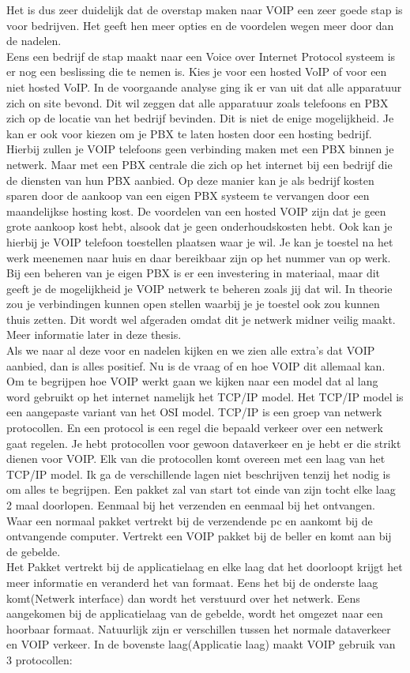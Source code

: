 \documentclass[pdftex,a4paper,12pt,twoside]{report}
\begin{document}
Het is dus zeer duidelijk dat de overstap maken naar VOIP een zeer goede stap is voor bedrijven. Het geeft hen meer opties en de voordelen wegen meer door dan de nadelen. \\
Eens een bedrijf de stap maakt naar een Voice over Internet Protocol systeem is er nog een beslissing die te nemen is. Kies je voor een hosted VoIP of voor een niet hosted VoIP.
In de voorgaande analyse ging ik er van uit dat alle apparatuur zich on site bevond. Dit wil zeggen dat alle apparatuur zoals telefoons en PBX zich op de locatie van het bedrijf bevinden.
Dit is niet de enige mogelijkheid. Je kan er ook voor kiezen om je PBX te laten hosten door een hosting bedrijf. Hierbij zullen je VOIP telefoons geen verbinding maken met een PBX binnen je netwerk.
Maar met een PBX centrale die zich op het internet bij een bedrijf die de diensten van hun PBX aanbied. Op deze manier kan je als bedrijf kosten sparen door de aankoop van een eigen PBX systeem te vervangen door een maandelijkse hosting kost.
De voordelen van een hosted VOIP zijn dat je geen grote aankoop kost hebt, alsook dat je geen onderhoudskosten hebt. Ook kan je hierbij je VOIP telefoon toestellen plaatsen waar je wil. Je kan je toestel na het werk meenemen naar huis en daar bereikbaar zijn op het nummer van op werk.
Bij een beheren van je eigen PBX is er een investering in materiaal, maar dit geeft je de mogelijkheid je VOIP netwerk te beheren zoals jij dat wil. In theorie zou je verbindingen kunnen open stellen waarbij je je toestel ook zou kunnen thuis zetten. Dit wordt wel afgeraden omdat dit je netwerk midner veilig maakt. Meer informatie later in deze thesis.
\\
Als we naar al deze voor en nadelen kijken en we zien alle extra's dat VOIP aanbied, dan is alles positief. Nu is de vraag of en hoe VOIP dit allemaal kan. Om te begrijpen hoe VOIP werkt gaan we kijken naar een model dat al lang word gebruikt op het internet namelijk het TCP/IP model. Het TCP/IP model is een aangepaste variant van het OSI model.
TCP/IP is een groep van netwerk protocollen. En een protocol is een regel die bepaald verkeer over een netwerk gaat regelen. Je hebt protocollen voor gewoon dataverkeer en je hebt er die strikt dienen voor VOIP. Elk van die protocollen komt overeen met een laag van het TCP/IP model. Ik ga de verschillende lagen niet beschrijven tenzij het nodig is om alles te begrijpen.
Een pakket zal van start tot einde van zijn tocht elke laag 2 maal doorlopen. Eenmaal bij het verzenden en eenmaal bij het ontvangen. Waar een normaal pakket vertrekt bij de verzendende pc en aankomt bij de ontvangende computer. Vertrekt een VOIP pakket bij de beller en komt aan bij de gebelde.\\
Het Pakket vertrekt bij de applicatielaag en elke laag dat het doorloopt krijgt het meer informatie en veranderd het van formaat. Eens het bij de onderste laag komt(Netwerk interface) dan wordt het verstuurd over het netwerk. Eens aangekomen bij de applicatielaag van de gebelde, wordt het omgezet naar een hoorbaar formaat.
\newpage
Natuurlijk zijn er verschillen tussen het normale dataverkeer en VOIP verkeer. In de bovenste laag(Applicatie laag) maakt VOIP gebruik van 3 protocollen:
\end{document}
